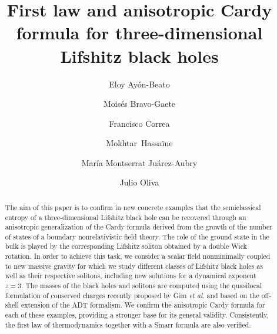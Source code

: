 \documentclass[prd,twocolumn,superscriptaddress,amsmath,amssymb,nofootinbib]{revtex4-1}
\begin{document}
\title{First law and anisotropic Cardy formula for
three-dimensional Lifshitz black holes}

\author{Eloy Ay\'on-Beato}

\author{Mois\'es Bravo-Gaete}
 

\author{Francisco Correa}
 

\author{Mokhtar~Hassa\"ine}
 

\author{Mar\'ia Montserrat Ju\'arez-Aubry}
  
\author{Julio Oliva}
 

\begin{abstract}
The aim of this paper is to confirm in new concrete examples
that the semiclassical entropy of a three-dimensional Lifshitz
black hole can be recovered through an anisotropic
generalization of the Cardy formula  derived from the growth of
the number of states of a boundary nonrelativistic field
theory. The role of the ground state in the bulk is played by
the corresponding Lifshitz soliton obtained by a double Wick
rotation. In order to achieve this task, we consider a scalar
field nonminimally coupled to new massive gravity for which we
study different classes of Lifshitz black holes as well as
their respective solitons, including new solutions for a
dynamical exponent $z=3$. The masses of the black holes and
solitons are computed using the quasilocal formulation of
conserved charges recently proposed by Gim \emph{et al}.
and based on the off-shell extension of the ADT formalism.  We
confirm the anisotropic Cardy formula for each of these
examples, providing a stronger base for its general validity.
Consistently, the first law of thermodynamics together with a
Smarr formula are also verified.
\end{abstract}
\end{document}
